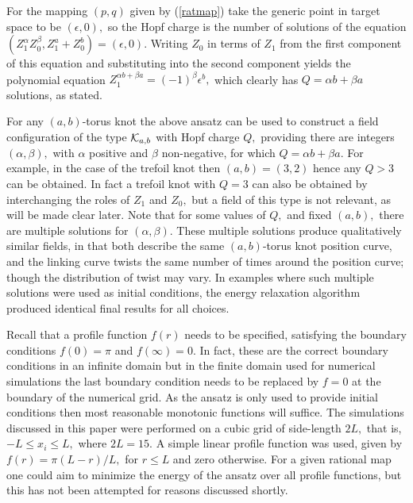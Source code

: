\documentclass[12pt]{article}
\begin{document}
For the mapping $(p,q)$ given by (\ref{ratmap}) take the generic
point in target space to be $(\epsilon,0),$ so the Hopf charge is
the number of solutions of the equation $(Z_1^\alpha
Z_0^\beta,Z_1^a+Z_0^b)=(\epsilon, 0).$ Writing $Z_0$ in terms of
$Z_1$ from the first component of this equation and substituting
into the second component yields the polynomial equation
$Z_1^{\alpha b+\beta a}=(-1)^\beta\epsilon^b,$ which clearly has
$Q=\alpha b+\beta a$ solutions, as stated.

For any $(a,b)$-torus knot the above ansatz can be used to construct
a field configuration of the type ${\cal K}_{a,b}$ with Hopf charge
$Q,$ providing there are integers $(\alpha,\beta),$ with $\alpha$
positive and $\beta$ non-negative, for which $Q=\alpha b+\beta a.$
For example, in the case of the trefoil knot then $(a,b)=(3,2)$ hence any
$Q>3$ can be obtained. In fact a trefoil knot with $Q=3$ can also be
obtained by interchanging the roles of $Z_1$ and $Z_0,$ but a field
of this type is not relevant, as will be made clear later. Note that
for some values of $Q,$ and fixed $(a,b),$ there are multiple
solutions for $(\alpha,\beta).$ These multiple solutions produce
qualitatively similar fields, in that both describe the same
$(a,b)$-torus knot position curve, and the linking curve twists the
same number of times around the position curve; though the
distribution of twist may vary. In examples where such multiple
solutions were used as initial conditions, the energy relaxation
algorithm produced identical final results for all choices.

Recall that a profile function $f(r)$ needs to be specified,
satisfying the boundary conditions $f(0)=\pi$ and $f(\infty)=0.$ In
fact, these are the correct boundary conditions in an infinite
domain but in the finite domain used for numerical simulations the
last boundary condition needs to be replaced by $f=0$ at the
boundary of the numerical grid. As the ansatz is only used to
provide initial conditions then most reasonable monotonic functions
will suffice. The simulations discussed in this paper were performed
on a cubic grid of side-length $2L,$ that is, $-L\le x_i\le L,$
where $2L=15.$ A simple linear profile function was used, given by
$f(r)=\pi(L-r)/L,$ for $r\le L$ and zero otherwise. For a given
rational map one could aim to minimize the energy of the ansatz over
all profile functions, but this has not been attempted for reasons
discussed shortly.
\end{document}

